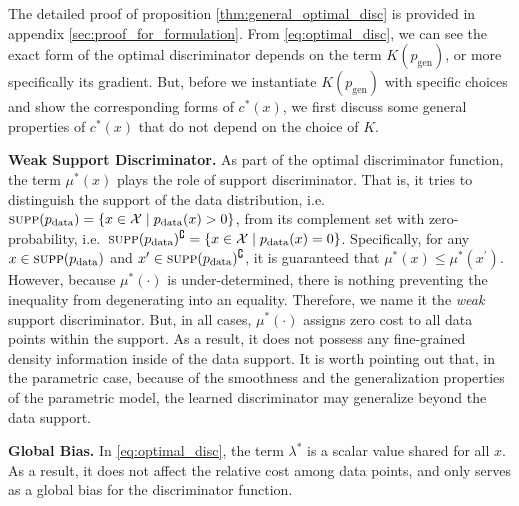 \documentclass[a4paper]{article}
\newcommand{\pd}{p_\text{data}}
\newcommand{\pg}{p_\text{gen}}
\begin{document}
The detailed proof of proposition \ref{thm:general_optimal_disc} is provided in appendix \ref{sec:proof_for_formulation}. 
From \eqref{eq:optimal_disc}, we can see the exact form of the optimal discriminator depends on the term $K(\pg)$, or more specifically its gradient.
But, before we instantiate $K(\pg)$ with specific choices and show the corresponding forms of $c^*(x)$, we first discuss some general properties of $c^*(x)$ that do not depend on the choice of $K$.

\textbf{Weak Support Discriminator.} As part of the optimal discriminator function, the term $\mu^*(x)$ plays the role of support discriminator. 
That is, it tries to distinguish the support of the data distribution, i.e.~$\textsc{supp}(\pd) = \{x \in \mathcal{X} \mid \pd(x) > 0\}$, from its complement set with zero-probability, i.e.~$\textsc{supp}(\pd)^\complement = \{x \in \mathcal{X} \mid \pd(x) = 0\}$.
Specifically, for any $x \in \textsc{supp}(\pd)$ and $x^\prime \in \textsc{supp}(\pd)^\complement$, it is guaranteed that $\mu^*(x) \leq \mu^*(x^\prime)$.
However, because $\mu^*(\cdot)$ is under-determined, there is nothing preventing the inequality from degenerating into an equality.
Therefore, we name it the \textit{weak} support discriminator.
But, in all cases, $\mu^*(\cdot)$ assigns zero cost to all data points within the support.
As a result, it does not possess any fine-grained density information inside of the data support.
It is worth pointing out that, in the parametric case, because of the smoothness and the generalization properties of the parametric model, the learned discriminator may generalize beyond the data support.

\textbf{Global Bias.} In \eqref{eq:optimal_disc}, the term $\lambda^*$ is a scalar value shared for all $x$.
As a result, it does not affect the relative cost among data points, and only serves as a global bias for the discriminator function.
\end{document}
